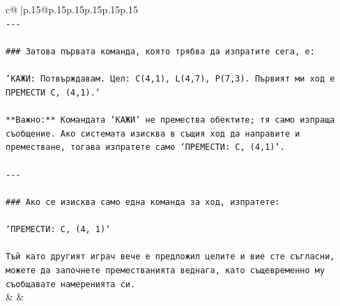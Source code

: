 \documentclass{article}
\begin{document}
{\begin{supertabular}{c@{$\;$}|p{.15\linewidth}@{}p{.15\linewidth}p{.15\linewidth}p{.15\linewidth}p{.15\linewidth}p{.15\linewidth}}
{{{\\ 
\texttt{{-}{-}{-}} \\
\\ 
\texttt{\#\#\# Затова първата команда, която трябва да изпратите сега, е:} \\
\\ 
\texttt{`КАЖИ: Потвърждавам. Цел: C(4,1), L(4,7), P(7,3). Първият ми ход е ПРЕМЕСТИ C, (4,1).`} \\
\\ 
\texttt{**Важно:** Командата `КАЖИ` не премества обектите; тя само изпраща съобщение. Ако системата изисква в същия ход да направите и преместване, тогава изпратете само `ПРЕМЕСТИ: C, (4,1)`.} \\
\\ 
\texttt{{-}{-}{-}} \\
\\ 
\texttt{\#\#\# Ако се изисква само една команда за ход, изпратете:} \\
\\ 
\texttt{`ПРЕМЕСТИ: C, (4, 1)`} \\
\\ 
\texttt{Тъй като другият играч вече е предложил целите и вие сте съгласни, можете да започнете преместванията веднага, като същевременно му съобщавате намеренията си.} \\
            }
        }
    }
    & & \\ \\


\end{supertabular}}
\end{document}
